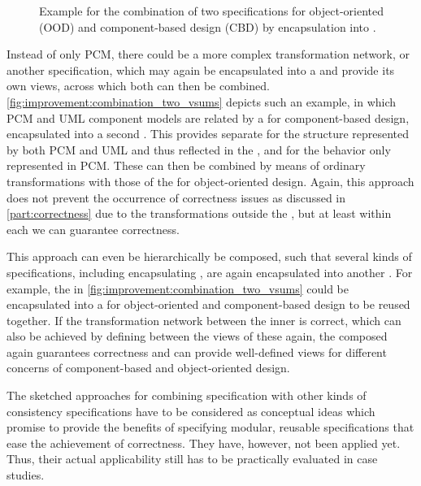 \begin{figure}
    \centering
    
    \caption[Combination of two \commonalities specifications]{Example for the combination of two \commonalities specifications for object-oriented (OOD) and component-based design (CBD) by encapsulation into \vsumms.}
    \label{fig:improvement:combination_two_vsums}
\end{figure}

Instead of only \gls{PCM}, there could be a more complex transformation network, or another \commonalities specification, which may again be encapsulated into a \vsum and provide its own views, across which both \vsums can then be combined.
\autoref{fig:improvement:combination_two_vsums} depicts such an example, in which \gls{PCM} and \gls{UML} component models are related by a \conceptmetamodel for component-based design, encapsulated into a second \vsum.
This \vsum provides separate \viewtypes for the structure represented by both \gls{PCM} and \gls{UML} and thus reflected in the \conceptmetamodels, and for the behavior only represented in \gls{PCM}.
These \viewtypes can then be combined by means of ordinary transformations with those of the \vsum for object-oriented design.
Again, this approach does not prevent the occurrence of correctness issues as discussed in \autoref{part:correctness} due to the transformations outside the \vsum, but at least within each \vsum we can guarantee correctness.

This approach can even be hierarchically be composed, such that several kinds of specifications, including encapsulating \vsums, are again encapsulated into another \vsum.
For example, the \vsums in \autoref{fig:improvement:combination_two_vsums} could be encapsulated into a \vsum for object-oriented and component-based design to be reused together.
If the transformation network between the inner \vsums is correct, which can also be achieved by defining \commonalities between the views of these \vsums again, the composed \vsum again guarantees correctness and can provide well-defined views for different concerns of component-based and object-oriented design.

The sketched approaches for combining \commonalities specification with other kinds of consistency specifications have to be considered as conceptual ideas which promise to provide the benefits of specifying modular, reusable specifications that ease the achievement of correctness.
They have, however, not been applied yet. 
Thus, their actual applicability still has to be practically evaluated in case studies.


